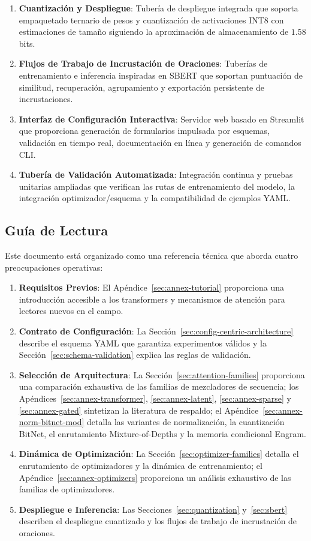 \begin{enumerate}[leftmargin=*]
    \item \textbf{Cuantización y Despliegue}: Tubería de despliegue integrada que soporta empaquetado ternario de pesos y cuantización de activaciones INT8 con estimaciones de tamaño siguiendo la aproximación de almacenamiento de $1.58$ bits.
    \item \textbf{Flujos de Trabajo de Incrustación de Oraciones}: Tuberías de entrenamiento e inferencia inspiradas en SBERT que soportan puntuación de similitud, recuperación, agrupamiento y exportación persistente de incrustaciones.
    \item \textbf{Interfaz de Configuración Interactiva}: Servidor web basado en Streamlit que proporciona generación de formularios impulsada por esquemas, validación en tiempo real, documentación en línea y generación de comandos CLI.
    \item \textbf{Tubería de Validación Automatizada}: Integración continua y pruebas unitarias ampliadas que verifican las rutas de entrenamiento del modelo, la integración optimizador/esquema y la compatibilidad de ejemplos YAML.
\end{enumerate}

\subsection{Guía de Lectura}

Este documento está organizado como una referencia técnica que aborda cuatro preocupaciones operativas:
\begin{enumerate}[leftmargin=*]
    \item \textbf{Requisitos Previos}: El Apéndice~\ref{sec:annex-tutorial} proporciona una introducción accesible a los transformers y mecanismos de atención para lectores nuevos en el campo.
    \item \textbf{Contrato de Configuración}: La Sección~\ref{sec:config-centric-architecture} describe el esquema YAML que garantiza experimentos válidos y la Sección~\ref{sec:schema-validation} explica las reglas de validación.
    \item \textbf{Selección de Arquitectura}: La Sección~\ref{sec:attention-families} proporciona una comparación exhaustiva de las familias de mezcladores de secuencia; los Apéndices~\ref{sec:annex-transformer}, \ref{sec:annex-latent}, \ref{sec:annex-sparse} y \ref{sec:annex-gated} sintetizan la literatura de respaldo; el Apéndice~\ref{sec:annex-norm-bitnet-mod} detalla las variantes de normalización, la cuantización BitNet, el enrutamiento Mixture-of-Depths y la memoria condicional Engram.
    \item \textbf{Dinámica de Optimización}: La Sección~\ref{sec:optimizer-families} detalla el enrutamiento de optimizadores y la dinámica de entrenamiento; el Apéndice~\ref{sec:annex-optimizers} proporciona un análisis exhaustivo de las familias de optimizadores.
    \item \textbf{Despliegue e Inferencia}: Las Secciones~\ref{sec:quantization} y~\ref{sec:sbert} describen el despliegue cuantizado y los flujos de trabajo de incrustación de oraciones.
\end{enumerate}

